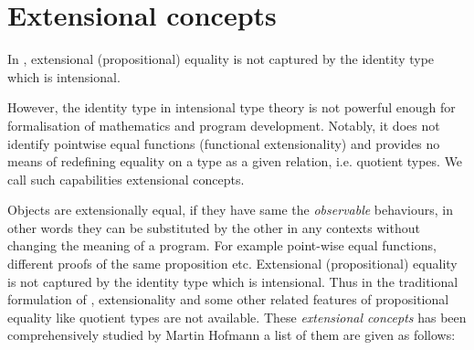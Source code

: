 


\section{Extensional concepts}
\label{extensionality}



In \itt, extensional (propositional) equality is not captured by the identity type which is intensional.

However, the identity type in intensional type theory is not powerful enough for formalisation of mathematics and program development. Notably, it does not identify pointwise equal functions (functional extensionality) and provides no means of redefining equality on a type as a given relation, i.e. quotient types. We call such capabilities extensional concepts.



Objects are extensionally equal, if they have same the \emph{observable} behaviours, in other words they  can be substituted by the other in any contexts without changing the meaning of a program. For example point-wise equal functions, different proofs of the same proposition etc. Extensional (propositional) equality is not captured by the identity type which is intensional.
Thus in the traditional formulation of \itt, extensionality and some other related features of propositional equality like quotient types are not available. These \emph{extensional concepts} has been comprehensively studied by Martin Hofmann \cite{hof:phd} a list of them are given as follows:


